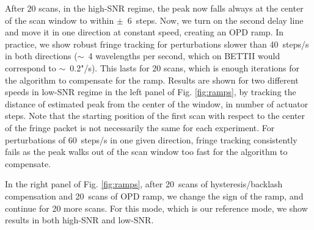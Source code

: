 After 20 scans, in the high-SNR regime, the peak now falls always at the center of the scan window to within $\pm$~6~steps. Now, we turn on the second delay line and move it in one direction at constant speed, creating an OPD ramp. In practice, we show robust fringe tracking for perturbations slower than 40~steps/s in both directions ($\sim$~4 wavelengths per second, which on BETTII would correspond to $\sim$~0.2"/s). This lasts for 20 scans, which is enough iterations for the algorithm to compensate for the ramp. Results are shown for two different speeds in low-SNR regime in the left panel of Fig. \ref{fig:ramps}, by tracking the distance of estimated peak from the center of the window, in number of actuator steps. Note that the starting position of the first scan with respect to the center of the fringe packet is not necessarily the same for each experiment. For perturbations of 60~steps/s in one given direction, fringe tracking consistently fails as the peak walks out of the scan window too fast for the algorithm to compensate.

In the right panel of Fig. \ref{fig:ramps}, after 20~scans of hysteresis/backlash compensation and 20~scans of OPD ramp, we change the sign of the ramp, and continue for 20 more scans. For this mode, which is our reference mode, we show results in both high-SNR and low-SNR.






